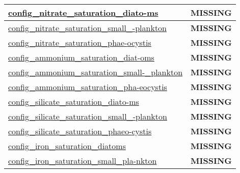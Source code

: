 {\begin{center}
\begin{longtable}{| p{2.0in} || p{4.0in} |}
    \hline
    \hyperref[subsec:nm_sec_config_nitrate_saturation_diatoms]{config\_nitrate\_saturation\_diato-}\hyperref[subsec:nm_sec_config_nitrate_saturation_diatoms]{ms}& {\bf \color{red} MISSING} \\
    \hline
    \hyperref[subsec:nm_sec_config_nitrate_saturation_small_plankton]{config\_nitrate\_saturation\_small\_-}\hyperref[subsec:nm_sec_config_nitrate_saturation_small_plankton]{plankton}& {\bf \color{red} MISSING} \\
    \hline
    \hyperref[subsec:nm_sec_config_nitrate_saturation_phaeocystis]{config\_nitrate\_saturation\_phae-}\hyperref[subsec:nm_sec_config_nitrate_saturation_phaeocystis]{ocystis}& {\bf \color{red} MISSING} \\
    \hline
    \hyperref[subsec:nm_sec_config_ammonium_saturation_diatoms]{config\_ammonium\_saturation\_diat-}\hyperref[subsec:nm_sec_config_ammonium_saturation_diatoms]{oms}& {\bf \color{red} MISSING} \\
    \hline
    \hyperref[subsec:nm_sec_config_ammonium_saturation_small_plankton]{config\_ammonium\_saturation\_small-}\hyperref[subsec:nm_sec_config_ammonium_saturation_small_plankton]{\_plankton}& {\bf \color{red} MISSING} \\
    \hline
    \hyperref[subsec:nm_sec_config_ammonium_saturation_phaeocystis]{config\_ammonium\_saturation\_pha-}\hyperref[subsec:nm_sec_config_ammonium_saturation_phaeocystis]{eocystis}& {\bf \color{red} MISSING} \\
    \hline
    \hyperref[subsec:nm_sec_config_silicate_saturation_diatoms]{config\_silicate\_saturation\_diato-}\hyperref[subsec:nm_sec_config_silicate_saturation_diatoms]{ms}& {\bf \color{red} MISSING} \\
    \hline
    \hyperref[subsec:nm_sec_config_silicate_saturation_small_plankton]{config\_silicate\_saturation\_small\_-}\hyperref[subsec:nm_sec_config_silicate_saturation_small_plankton]{plankton}& {\bf \color{red} MISSING} \\
    \hline
    \hyperref[subsec:nm_sec_config_silicate_saturation_phaeocystis]{config\_silicate\_saturation\_phaeo-}\hyperref[subsec:nm_sec_config_silicate_saturation_phaeocystis]{cystis}& {\bf \color{red} MISSING} \\
    \hline
    \hyperref[subsec:nm_sec_config_iron_saturation_diatoms]{config\_iron\_saturation\_diatoms} & {\bf \color{red} MISSING} \\
    \hline
    \hyperref[subsec:nm_sec_config_iron_saturation_small_plankton]{config\_iron\_saturation\_small\_pla-}\hyperref[subsec:nm_sec_config_iron_saturation_small_plankton]{nkton}& {\bf \color{red} MISSING} \\

\end{longtable}
\end{center}}
